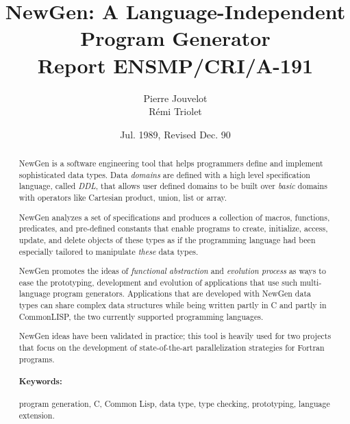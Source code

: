 

\newcommand{\titre}{NewGen: A Language-Independent Program Generator}
\newcommand{\auteur}{Pierre Jouvelot \\ R\'emi Triolet}
\newcommand{\docdate}{Jul. 1989, Revised Dec. 90}
\newcommand{\numero}{191}

\title{\titre \\ Report ENSMP/CRI/A-\numero}
\author{\auteur}
\date{\docdate}

\newenvironment{pgm}{\tt \samepage \begin{tabbing}}{\end{tabbing} \rm}


\maketitle


\begin{abstract}

NewGen is a software engineering tool that helps programmers define and
implement sophisticated data types. Data {\em domains} are defined with
a high level specification language, called {\em DDL}, that allows user
defined domains to be built over {\em basic} domains with
operators like Cartesian product, union, list or array.

NewGen analyzes a set of specifications and produces a collection of
macros, functions, predicates, and pre-defined constants that enable
programs to create, initialize, access, update, and delete objects of
these types as if the programming language had been especially tailored
to manipulate {\em these} data types.  

NewGen promotes the ideas of {\em functional abstraction} and {\em
evolution process} as ways to ease the prototyping, development and
evolution of applications that use such multi-language program
generators.  Applications that are developed with NewGen data types can
share complex data structures while being written partly in C and partly
in CommonLISP, the two currently supported programming languages.

NewGen ideas have been validated in practice; this tool is heavily used
for two projects that focus on the development of state-of-the-art
parallelization strategies for Fortran programs.

\paragraph{Keywords:} program generation, C, Common Lisp, data type,
type checking, prototyping, language extension.

\end{abstract}

